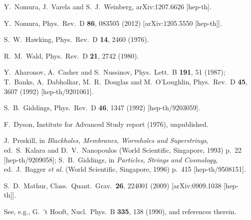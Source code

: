 \documentclass[12pt]{article}
\begin{document}
\begin{thebibliography}{99}
Y.~Nomura, J.~Varela and S.~J.~Weinberg,
arXiv:1207.6626 [hep-th].

Y.~Nomura,
Phys.\ Rev.\ D {\bf 86}, 083505 (2012)
[arXiv:1205.5550 [hep-th]].

S.~W.~Hawking,
Phys.\ Rev.\ D {\bf 14}, 2460 (1976).

R.~M.~Wald,
Phys.\ Rev.\ D {\bf 21}, 2742 (1980).

Y.~Aharonov, A.~Casher and S.~Nussinov,
Phys.\ Lett.\ B {\bf 191}, 51 (1987);
T.~Banks, A.~Dabholkar, M.~R.~Douglas and M.~O'Loughlin,
Phys.\ Rev.\ D {\bf 45}, 3607 (1992)
[hep-th/9201061].

S.~B.~Giddings,
Phys.\ Rev.\ D {\bf 46}, 1347 (1992)
[hep-th/9203059].

F.~Dyson,
Institute for Advanced Study report (1976),
unpublished.

J.~Preskill,
in {\it Blackholes, Membranes, Wormholes and Superstrings},
ed.\ S.~Kalara and D.~V.~Nanopoulos (World Scientific, Singapore, 1993) p.~22
[hep-th/9209058];
S.~B.~Giddings,
in {\it Particles, Strings and Cosmology},
ed.\ J.~Bagger {\it et al.} (World Scientific, Singapore, 1996) p.~415
[hep-th/9508151].

S.~D.~Mathur,
Class.\ Quant.\ Grav.\  {\bf 26}, 224001 (2009)
[arXiv:0909.1038 [hep-th]].

See, e.g.,
G.~'t Hooft,
Nucl.\ Phys.\ B {\bf 335}, 138 (1990),
and references therein.


\end{thebibliography}
\end{document}
